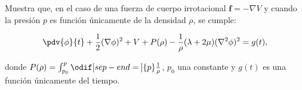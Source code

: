 \documentclass[../main.tex]{subfiles}
\begin{document}
\begin{problema}
	Muestra que, en el caso de una fuerza de cuerpo irrotacional
	\(\bm{f} = -\nabla{V}\) y cuando la presión \(p\) es función
	únicamente de la densidad \(\rho\), se cumple:

	\begin{equation*}
		\pdv{\phi}{t} + \dfrac{1}{2}(\nabla{\phi})^{2} + V +
		P(\rho) - \dfrac{1}{\rho}(\lambda + 2\mu)(\nabla^{2}{\phi})^{2} =
		g(t),
	\end{equation*}

	donde \(P(\rho) = \int_{p_{0}}^{p}\odif[sep-end=\medspace]{p} \tfrac{1}{\rho}\),
	\( p_{0}\) una constante y \( g(t)\) es una función únicamente
	del tiempo.
\end{problema}
\end{document}
